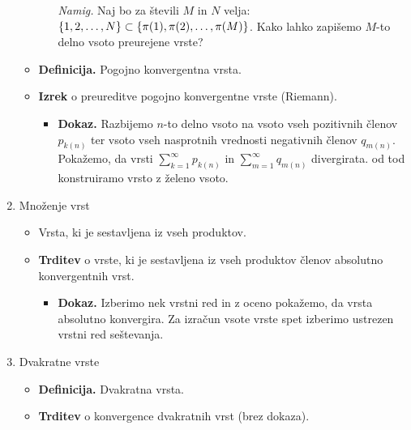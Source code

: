 \begin{enumerate}
\begin{itemize}
\begin{itemize}
            \emph{Namig.} Naj bo za števili $M$ in $N$ velja: $\left\{1, 2, \ldots, N\right\} \subset \left\{\pi(1), \pi(2), \ldots, \pi(M)\right\}$. Kako lahko zapišemo $M$-to delno vsoto preurejene vrste?
        \end{itemize}
        \item  \colorbox{purple!30}{\textbf{Definicija.}} Pogojno konvergentna vrsta.
        \item \colorbox{blue!30}{\textbf{Izrek}} o preureditve pogojno konvergentne vrste (Riemann).
        \begin{itemize}
            \item \colorbox{green!30}{\textbf{Dokaz.}} Razbijemo $n$-to delno vsoto na vsoto vseh pozitivnih členov $p_{k(n)}$ ter vsoto vseh nasprotnih vrednosti negativnih členov $q_{m(n)}$. Pokažemo, da vrsti $\sum_{k=1}^{\infty} p_{k(n)}$ in $\sum_{m=1}^{\infty} q_{m(n)}$ divergirata. od tod konstruiramo vrsto z želeno vsoto.
        \end{itemize}
    \end{itemize}

    \item Množenje vrst
    \begin{itemize}
        \item Vrsta, ki je sestavljena iz vseh produktov.
        \item \colorbox{blue!30}{\textbf{Trditev}} o vrste, ki je sestavljena iz vseh produktov členov absolutno konvergentnih vrst.
        \begin{itemize}
            \item \colorbox{green!30}{\textbf{Dokaz.}} Izberimo nek vrstni red in z oceno pokažemo, da vrsta absolutno konvergira. Za izračun vsote vrste spet izberimo ustrezen vrstni red seštevanja.
        \end{itemize}
    \end{itemize}

    \item Dvakratne vrste
    \begin{itemize}
        \item  \colorbox{purple!30}{\textbf{Definicija.}} Dvakratna vrsta.
        \item  \colorbox{blue!30}{\textbf{Trditev}} o konvergence dvakratnih vrst (brez dokaza).
    \end{itemize}
\end{enumerate}